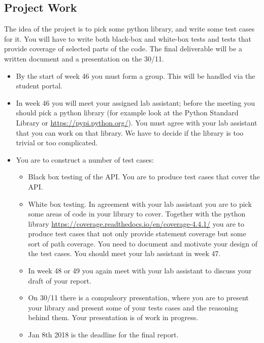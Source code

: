 \documentclass[a4page]{article}
\begin{document}
\subsection{Project Work}

The idea of the project is to pick some python library, and write some
test cases for it. You will have to write both black-box and white-box
tests and tests that provide coverage of selected parts of the
code. The final deliverable will be a written document and a
presentation on the 30/11. 
  \begin{itemize}
  \item By  the start of  week  46 you must form a group. This will be
    handled via the student portal.
  \item In week 46 you will meet your assigned lab assistant; before the
    meeting you should pick a python library (for example look at the Python
    Standard Library or \url{https://pypi.python.org/}). You must agree
    with your lab assistant that you can work on that library. We have
    to decide if the library is too trivial or too complicated.
  \item You are to construct a number of test cases:
    \begin{itemize}
    \item  Black box testing of the API. You are to produce test cases
      that cover the API.
    \item  White box testing. In agreement with your lab assistant you
      are to pick some areas of code in your library to cover. Together with
      the python library
      \url{https://coverage.readthedocs.io/en/coverage-4.4.1/} you are
      to produce test cases that not only provide statement coverage
      but some sort of path coverage. You need to document and
      motivate your design of the test cases. You should meet your lab
      assistant in week 47.
    \item In week 48 or 49 you again meet with your lab assistant to
      discuss your draft of your  report.
    \item On 30/11 there is a compulsory presentation, where you are
      to present your library and present some of your tests cases
      and the reasoning behind them. Your presentation is of work in
      progress. 
    \item Jan 8th 2018 is  the deadline for the final
      report. 
    \end{itemize}
  \end{itemize}
\end{document}
